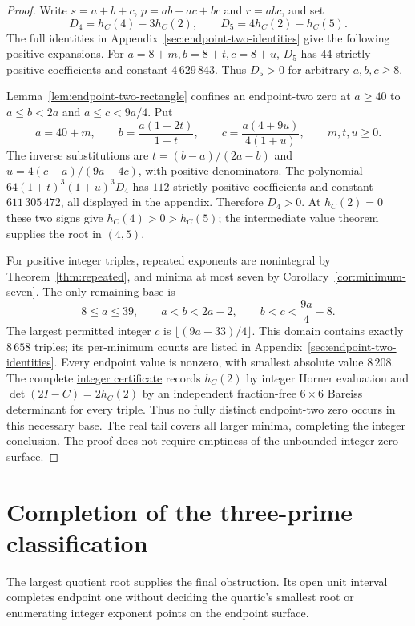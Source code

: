\begin{proof}
Write $s=a+b+c$, $p=ab+ac+bc$ and $r=abc$, and set
\[
 D_4=h_C(4)-3h_C(2),\qquad D_5=4h_C(2)-h_C(5).
\]
The full identities in Appendix~\ref{sec:endpoint-two-identities} give
the following positive expansions. For $a=8+m,b=8+t,c=8+u$,
$D_5$ has $44$ strictly positive coefficients and constant
$4\,629\,843$. Thus $D_5>0$ for arbitrary $a,b,c\geq8$.

Lemma~\ref{lem:endpoint-two-rectangle} confines an endpoint-two zero
at $a\geq40$ to $a\leq b<2a$ and $a\leq c<9a/4$. Put
\[
 a=40+m,\qquad b=\frac{a(1+2t)}{1+t},\qquad
 c=\frac{a(4+9u)}{4(1+u)},\qquad m,t,u\geq0.
\]
The inverse substitutions are $t=(b-a)/(2a-b)$ and
$u=4(c-a)/(9a-4c)$, with positive denominators. The polynomial
$64(1+t)^3(1+u)^3D_4$ has $112$ strictly positive coefficients and
constant $611\,305\,472$, all displayed in the appendix. Therefore
$D_4>0$. At $h_C(2)=0$ these two signs give $h_C(4)>0>h_C(5)$;
the intermediate value theorem supplies the root in $(4,5)$.

For positive integer triples, repeated exponents are nonintegral by
Theorem~\ref{thm:repeated}, and minima at most seven by
Corollary~\ref{cor:minimum-seven}. The only remaining base is
\[
 8\leq a\leq39,\qquad a<b<2a-2,\qquad b<c<\frac{9a}{4}-8.
\]
The largest permitted integer $c$ is $\lfloor(9a-33)/4\rfloor$.
This domain contains exactly $8\,658$ triples; its per-minimum counts
are listed in Appendix~\ref{sec:endpoint-two-identities}. Every endpoint
value is nonzero, with smallest absolute value $8\,208$.
The complete
\href{https://github.com/the-omega-institute/ideal-intersection-laplacian/blob/4afe151e1dc7193e6776cc1b08d3606aa804238e/results/endpoint-two-completion-base.csv}{integer certificate}
records $h_C(2)$ by integer Horner evaluation and
$\det(2I-C)=2h_C(2)$ by an independent fraction-free $6\times6$
Bareiss determinant for every triple. Thus no fully distinct endpoint-two
zero occurs in this necessary base. The real tail covers all larger
minima, completing the integer conclusion. The proof does not require
emptiness of the unbounded integer zero surface.
\end{proof}

\section{Completion of the three-prime classification}
\label{sec:three-prime-classification}

The largest quotient root supplies the final obstruction. Its open unit
interval completes endpoint one without deciding the quartic's smallest
root or enumerating integer exponent points on the endpoint surface.

